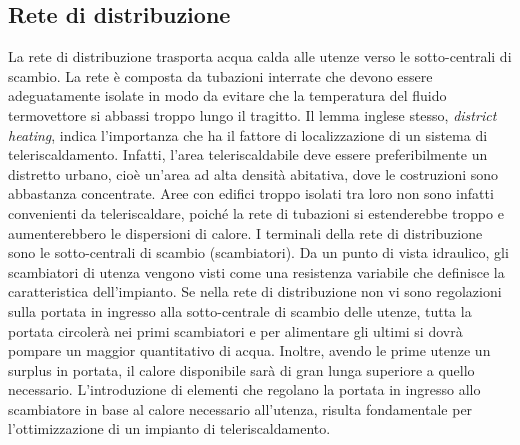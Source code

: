 \documentclass[laurea,oneside,11pt]{USiena_tesiLM3}
\begin{document}
%
%
%
%

\subsection{Rete di distribuzione}
La rete di distribuzione trasporta acqua calda alle utenze verso le sotto-centrali di scambio. La rete è composta da tubazioni interrate che  devono  essere adeguatamente isolate  in  modo  da  evitare  che  la temperatura  del fluido termovettore si abbassi troppo lungo il tragitto. 
Il  lemma  inglese  stesso,  \textit{district  heating},  indica  l'importanza  che  ha  il  fattore  di localizzazione  di un sistema  di  teleriscaldamento. Infatti,  l'area  teleriscaldabile  deve  essere  preferibilmente  un distretto  urbano,  cioè  un'area  ad  alta  densità  abitativa,  dove  le  costruzioni  sono abbastanza concentrate.
Aree  con  edifici  troppo  isolati  tra  loro  non  sono  infatti  convenienti  da  teleriscaldare, poiché
la rete di tubazioni si estenderebbe troppo e aumenterebbero le dispersioni di calore.
I terminali della rete di distribuzione sono le sotto-centrali di scambio (scambiatori). Da un punto di vista idraulico, gli scambiatori di utenza vengono visti come una resistenza variabile che definisce la caratteristica dell'impianto. 
Se nella rete di distribuzione non vi sono regolazioni sulla portata in ingresso alla sotto-centrale di scambio delle utenze, tutta la portata circolerà nei primi scambiatori e per alimentare gli ultimi si dovrà pompare un maggior quantitativo di acqua. Inoltre, avendo le prime utenze un surplus in portata, il calore disponibile sarà di gran lunga superiore a quello necessario. 
L'introduzione di elementi che regolano la portata in ingresso allo scambiatore in base al calore necessario all'utenza, risulta fondamentale per l'ottimizzazione di un impianto di teleriscaldamento. 
\end{document}
